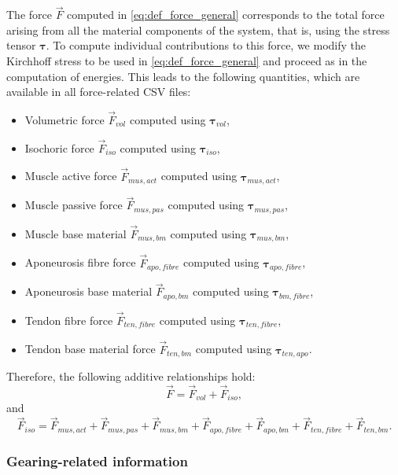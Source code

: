 \documentclass{sfuthesis}
\numberwithin{equation}{section}
\numberwithin{figure}{chapter}
\numberwithin{table}{chapter}
\theoremstyle{definition}
\def\btau{{\bm{\tau}}}
\begin{document}
The force $\vec{F}$ computed in \eqref{eq:def_force_general} corresponds to the total force arising from all the material components of the system, that is, using the stress tensor $\btau$. To compute individual contributions to this force, we modify the Kirchhoff stress to be used in \eqref{eq:def_force_general} and proceed as in the computation of energies. This leads to the following quantities, which are available in all force-related CSV files:
\begin{itemize}
    \item Volumetric force $\vec{F}_{vol}$ computed using $\btau_{vol}$,
    \item Isochoric force $\vec{F}_{iso}$ computed using $\btau_{iso}$,
    \item Muscle active force $\vec{F}_{mus,act}$ computed using $\btau_{mus,act}$,
    \item Muscle passive force $\vec{F}_{mus,pas}$ computed using $\btau_{mus,pas}$,
    \item Muscle base material $\vec{F}_{mus,bm}$ computed using $\btau_{mus,bm}$,
    \item Aponeurosis fibre force $\vec{F}_{apo,fibre}$ computed using $\btau_{apo,fibre}$,
    \item Aponeurosis base material $\vec{F}_{apo,bm}$ computed using $\btau_{bm,fibre}$,
    \item Tendon fibre force $\vec{F}_{ten,fibre}$ computed using $\btau_{ten,fibre}$,
    \item Tendon base material force $\vec{F}_{ten,bm}$ computed using $\btau_{ten,apo}$.
\end{itemize}
Therefore, the following additive relationships hold:
\begin{equation}
    \vec{F} = \vec{F}_{vol} + \vec{F}_{iso},
\end{equation}
and
\begin{equation}
    \vec{F}_{iso} = \vec{F}_{mus,act} + \vec{F}_{mus,pas} + \vec{F}_{mus,bm} + \vec{F}_{apo,fibre} + \vec{F}_{apo,bm} + \vec{F}_{ten,fibre} + \vec{F}_{ten,bm}.
\end{equation}

\subsubsection{Gearing-related information} \label{sec:flexodeal-gearing-related-info}
\end{document}

